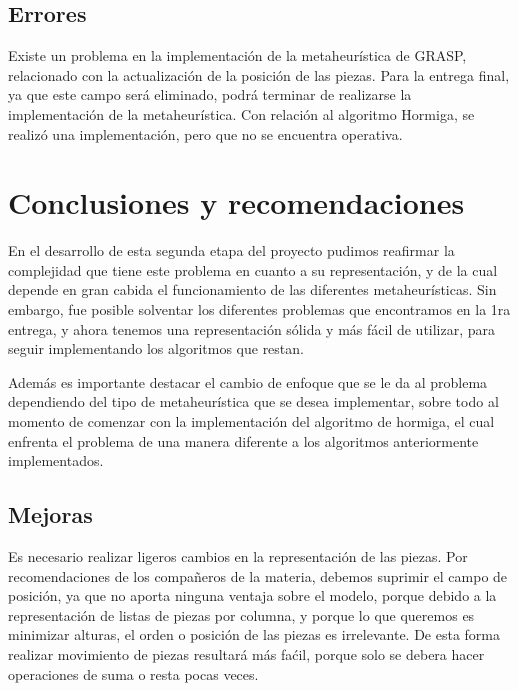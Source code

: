 \documentclass[letterpaper,11pt]{article}
\begin{document}
\subsection{Errores}

Existe un problema en la implementaci\'on de la metaheur\'istica de GRASP, relacionado
con la actualizaci\'on de la posici\'on de las piezas. Para la entrega final, ya que este campo
ser\'a eliminado, podr\'a terminar de realizarse la implementaci\'on de la metaheur\'istica. Con relaci\'on 
al algoritmo Hormiga, se realiz\'o una implementaci\'on, pero que no se encuentra operativa.

\newpage

\section{Conclusiones y recomendaciones}

En el desarrollo de esta segunda etapa del proyecto pudimos reafirmar la complejidad que tiene este problema
en cuanto a su representaci\'on, y de la cual depende en gran cabida el funcionamiento de las diferentes 
metaheur\'isticas. Sin embargo, fue posible solventar los diferentes problemas que encontramos en la 1ra entrega,
y ahora tenemos una representaci\'on s\'olida y m\'as f\'acil de utilizar, para seguir implementando los algoritmos
que restan.

Adem\'as es importante destacar el cambio de enfoque que se le da al problema dependiendo del tipo de metaheur\'istica
que se desea implementar, sobre todo al momento de comenzar con la implementaci\'on del algoritmo de hormiga, el 
cual enfrenta el problema de una manera diferente a los algoritmos anteriormente implementados.

\subsection{Mejoras}

Es necesario realizar ligeros cambios en la representaci\'on de las piezas. Por recomendaciones de los compa\~neros de
la materia, debemos suprimir el campo de posici\'on, ya que no aporta ninguna ventaja sobre el modelo, porque debido
a la representaci\'on de listas de piezas por columna, y porque lo que queremos es minimizar alturas, el orden o 
posici\'on de las piezas es irrelevante. De esta forma realizar movimiento de piezas resultar\'a m\'as fa\'cil, porque
solo se debera hacer operaciones de suma o resta pocas veces.
\newpage
\end{document}
